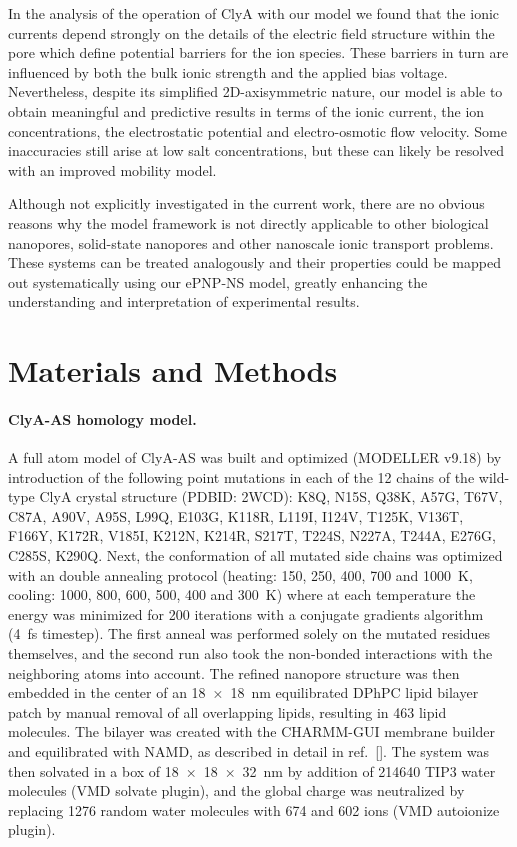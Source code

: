 \documentclass[journal=ancac3,manuscript=article,etalmode=truncate,maxauthors=0,layout=onecolumn]{achemso}
\begin{document}
In the analysis of the operation of ClyA with our model we found that the ionic currents depend strongly on
the details of the electric field structure within the pore which define potential barriers for the ion
species. These barriers in turn are influenced by both the bulk ionic strength and the applied bias voltage.
Nevertheless, despite its simplified 2D-axisymmetric nature, our model is able to obtain meaningful and
predictive results in terms of the ionic current, the ion concentrations, the electrostatic potential and
electro-osmotic flow velocity. Some inaccuracies still arise at low salt concentrations, but these can likely
be resolved with an improved mobility model.

Although not explicitly investigated in the current work, there are no obvious reasons why the model framework
is not directly applicable to other biological nanopores, solid-state nanopores and other nanoscale ionic
transport problems. These systems can be treated analogously and their properties could be mapped out
systematically using our ePNP-NS model, greatly enhancing the understanding and interpretation of experimental
results.

%
%
\section{Materials and Methods}\label{sec:methods}

\paragraph{ClyA-AS homology model.}
%
A full atom model of ClyA-AS\cite{Soskine-2013} was built and optimized (MODELLER v9.18\cite{Sali-1993}) by
introduction of the following point mutations in each of the 12 chains of the wild-type ClyA crystal structure
(PDBID: 2WCD\cite{Mueller-2009}): K8Q, N15S, Q38K, A57G, T67V, C87A, A90V, A95S, L99Q, E103G, K118R, L119I,
I124V, T125K, V136T, F166Y, K172R, V185I, K212N, K214R, S217T, T224S, N227A, T244A, E276G, C285S, K290Q. Next,
the conformation of all mutated side chains was optimized with an double annealing protocol (heating: 150,
250, 400, 700 and \SI{1000}{\kelvin}, cooling: 1000, 800, 600, 500, 400 and \SI{300}{\kelvin}) where at each
temperature the energy was minimized for 200 iterations with a conjugate gradients algorithm (\SI{4}{\fs}
timestep).\cite{Shanno-1980} The first anneal was performed solely on the mutated residues themselves, and the
second run also took the non-bonded interactions with the neighboring atoms into account. The refined nanopore
structure was then embedded in the center of an \SI{18x18}{\nm} equilibrated DPhPC lipid bilayer patch by
manual removal of all overlapping lipids, resulting in 463 lipid molecules. The bilayer was created with the
CHARMM-GUI\cite{Jo-2008} membrane builder\cite{Lee-2016} and equilibrated with NAMD\cite{Phillips-2005}, as
described in detail in ref.~[]. The system was then solvated in a box of \SI{18x18x32}{\nm}
by addition of 214640 TIP3 water molecules (VMD solvate plugin), and the global charge was neutralized by
replacing 1276 random water molecules with 674 \Na{} and 602 \Cl{} ions (VMD autoionize
plugin).\cite{Humphrey-1996}
\end{document}
